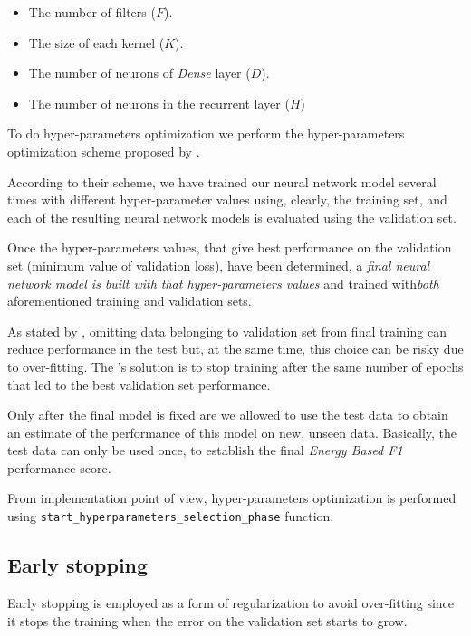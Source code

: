 \documentclass[sigconf]{acmart}
\begin{document}
\begin{itemize}
\item The number of filters ($F$).
\item The size of each kernel ($K$).
\item The number of neurons of \textit{Dense} layer ($D$).
\item The number of neurons in the recurrent layer ($H$)
\end{itemize}

To do hyper-parameters optimization we perform the hyper-parameters optimization scheme proposed by \citet{FalessiDataMining}. 

According to their scheme, we have trained our neural network model several times with different hyper-parameter values using, clearly, the training set, and each of the resulting neural network models is evaluated using the validation set.

Once the hyper-parameters values, that give best performance on the validation set (minimum value of validation loss), have been determined, a \textit{final neural network model is built with that hyper-parameters values} and trained with\textit{both} aforementioned training and validation sets.

As stated by \citet{FalessiDataMining}, omitting data belonging to validation set from final training can reduce performance in the test but, at the same time, this choice can be risky due to over-fitting. The \citet{FalessiDataMining}'s solution is to stop training after the same number of epochs that led to the best validation set performance.

Only after the final model is fixed are we allowed to use the test data to obtain an estimate of the performance of this model on new, unseen data. Basically, the test data can only be used once, to establish the final \textit{Energy Based F1} performance score.

From implementation point of view, hyper-parameters optimization is performed using \texttt{start\_\-hyper\-para\-meters\_\-sele\-ction\-\_phase} function.

\subsection{Early stopping}

Early stopping is employed as a form of regularization to avoid over-fitting since it stops the training when the error on
the validation set starts to grow. 
\end{document}
